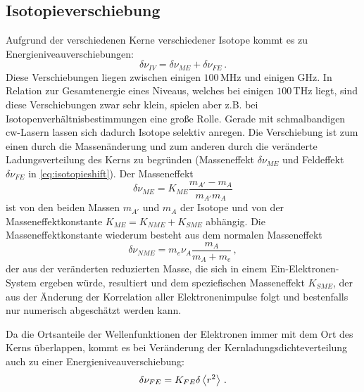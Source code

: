 
\subsection{Isotopieverschiebung}\label{subsec:isotopieverschiebung}
Aufgrund der verschiedenen Kerne verschiedener Isotope kommt es zu
Energieniveauverschiebungen:
\begin{equation}\label{eq:isotopieshift}
	\delta\nu_{IV}=\delta\nu_{ME}+\delta\nu_{FE}\,.
\end{equation}
Diese Verschiebungen liegen zwischen einigen $100\,$MHz und einigen GHz. In
Relation zur Gesamtenergie eines Niveaus, welches bei einigen $100\,$THz liegt,
sind diese Verschiebungen zwar sehr klein, spielen aber z.B. bei
Isotopenverhältnisbestimmungen eine große Rolle. Gerade mit schmalbandigen
cw-Lasern lassen sich dadurch Isotope selektiv anregen. Die Verschiebung ist zum
einen durch die Massenänderung und zum anderen durch die veränderte Ladungsverteilung des Kerns zu begründen (Masseneffekt $\delta\nu_{ME}$ und Feldeffekt $\delta\nu_{FE}$ in \eqref{eq:isotopieshift}). Der Masseneffekt
\begin{equation}\label{eq:masseneffekt}
	\delta\nu_{ME}=K_{ME}\frac{m_{A'}-m_A}{m_{A'}m_A}
\end{equation}
ist von den beiden Massen $m_{A'}$ und $m_A$ der Isotope und von der
Masseneffektkonstante $K_{ME}=K_{NME}+K_{SME}$ abhängig. Die
Masseneffektkonstante wiederum besteht aus dem normalen Masseneffekt
\begin{equation}\label{eq:normaler_masseneffekt}
	\delta\nu_{NME}=m_e\nu_A\frac{m_A}{m_A+m_e}\,,
\end{equation}
der aus der veränderten reduzierten Masse, die sich in einem
Ein-Elektronen-System ergeben würde, resultiert und dem speziefischen
Masseneffekt $K_{SME}$, der aus der Änderung der Korrelation aller
Elektronenimpulse folgt und bestenfalls nur numerisch abgeschätzt werden
kann. \par Da die Ortsanteile der Wellenfunktionen der Elektronen immer mit dem Ort des
Kerns überlappen, kommt es bei Veränderung der Kernladungsdichteverteilung auch
zu einer Energieniveauverschiebung:
\begin{equation}\label{eq:feldeffekt}
	\delta\nu_{FE}=K_{FE}\delta\left\langle r^2\right\rangle\,.
\end{equation}

